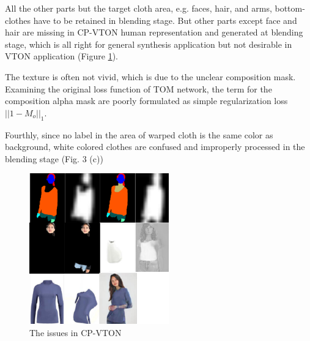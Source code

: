 All the other parts but the target cloth area, e.g. faces, hair, and arms, bottom-clothes have to be retained in blending stage. But other parts except face and hair are missing in CP-VTON\cite{Wang2018TowardCI} human representation and generated at blending stage, which is all right for general synthesis application but not desirable in VTON application (Figure \ref{fig:cpvtonissues}). 


The texture is often not vivid, which is due to the unclear composition mask. Examining the original loss function of TOM network, the term for the composition alpha mask are poorly formulated as simple regularization loss $|| 1 - M_{o} ||_1$.   

%


Fourthly, since no label in the area of warped cloth is the same color as background, white colored clothes are confused and improperly processed in the blending stage (Fig. 3 (c))



\begin{figure}
\centering
\includegraphics[height=6.5cm, scale=1]{figures/cpvtonissues.png}   %
\caption{The issues in CP-VTON}
\label{fig:cpvtonissues}
\end{figure}



